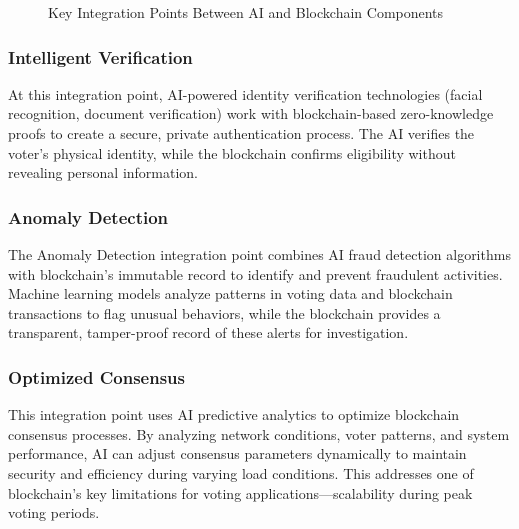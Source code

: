 \documentclass[conference]{IEEEtran}
\begin{document}
\begin{figure}[!h]
\centering
{}
\caption{Key Integration Points Between AI and Blockchain Components}
\label{fig:integration}
\end{figure}

\subsubsection{Intelligent Verification}
At this integration point, AI-powered identity verification technologies (facial recognition, document verification) work with blockchain-based zero-knowledge proofs to create a secure, private authentication process. The AI verifies the voter's physical identity, while the blockchain confirms eligibility without revealing personal information.

\subsubsection{Anomaly Detection}
The Anomaly Detection integration point combines AI fraud detection algorithms with blockchain's immutable record to identify and prevent fraudulent activities. Machine learning models analyze patterns in voting data and blockchain transactions to flag unusual behaviors, while the blockchain provides a transparent, tamper-proof record of these alerts for investigation.

\subsubsection{Optimized Consensus}
This integration point uses AI predictive analytics to optimize blockchain consensus processes. By analyzing network conditions, voter patterns, and system performance, AI can adjust consensus parameters dynamically to maintain security and efficiency during varying load conditions. This addresses one of blockchain's key limitations for voting applications—scalability during peak voting periods.
\end{document}
